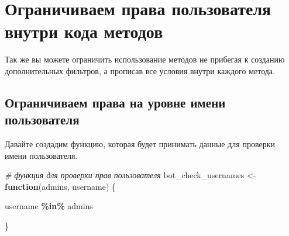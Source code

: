 \documentclass[
]{book}
\newenvironment{Shaded}{\begin{snugshade}}{\end{snugshade}}
\newcommand{\CommentTok}[1]{\textcolor[rgb]{0.56,0.35,0.01}{\textit{#1}}}
\newcommand{\ControlFlowTok}[1]{\textcolor[rgb]{0.13,0.29,0.53}{\textbf{#1}}}
\newcommand{\FunctionTok}[1]{\textcolor[rgb]{0.13,0.29,0.53}{\textbf{#1}}}
\newcommand{\NormalTok}[1]{#1}
\newcommand{\OtherTok}[1]{\textcolor[rgb]{0.56,0.35,0.01}{#1}}
\newcommand{\SpecialCharTok}[1]{\textcolor[rgb]{0.81,0.36,0.00}{\textbf{#1}}}
\begin{document}
\begin{Shaded}
\end{Shaded}

\section{Ограничиваем права пользователя внутри кода методов}\label{ux43eux433ux440ux430ux43dux438ux447ux438ux432ux430ux435ux43c-ux43fux440ux430ux432ux430-ux43fux43eux43bux44cux437ux43eux432ux430ux442ux435ux43bux44f-ux432ux43dux443ux442ux440ux438-ux43aux43eux434ux430-ux43cux435ux442ux43eux434ux43eux432}

Так же вы можете ограничить использование методов не прибегая к созданию дополнительных фильтров, а прописав все условия внутри каждого метода.

\subsection{Ограничиваем права на уровне имени пользователя}\label{ux43eux433ux440ux430ux43dux438ux447ux438ux432ux430ux435ux43c-ux43fux440ux430ux432ux430-ux43dux430-ux443ux440ux43eux432ux43dux435-ux438ux43cux435ux43dux438-ux43fux43eux43bux44cux437ux43eux432ux430ux442ux435ux43bux44f-1}

Давайте создадим функцию, которая будет принимать данные для проверки имени пользователя.

\begin{Shaded}
\begin{Highlighting}[]
\CommentTok{\# функция для проверки прав пользователя}
\NormalTok{bot\_check\_usernames }\OtherTok{\textless{}{-}} 
  \ControlFlowTok{function}\NormalTok{(admins, username) \{}
  
\NormalTok{   username }\SpecialCharTok{\%in\%}\NormalTok{ admins }
  
\NormalTok{\}}
\end{Highlighting}
\end{Shaded}
\end{document}
